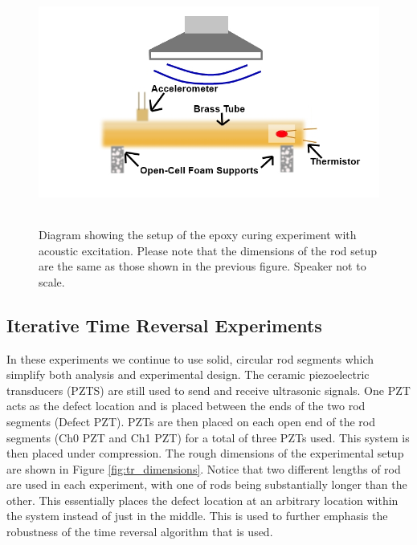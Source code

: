 \documentclass[]{aiaa-tc}%
\begin{document}
\begin{figure}[H]%
\centering
 \includegraphics[height = 8cm]{epoxy_diagram_new_speaker}
 \caption{Diagram showing the setup of the epoxy curing experiment with acoustic excitation. Please note that the dimensions of the rod setup are the same as those shown in the previous figure. Speaker not to scale.}
 \label{fig:epoxy_sound}
\end{figure}


\subsection{Iterative Time Reversal Experiments}

In these experiments we continue to use solid, circular rod segments which simplify both analysis and experimental design. The ceramic piezoelectric transducers (PZTS) are still used to send and receive ultrasonic signals. One PZT acts as the defect location and is placed between the ends of the two rod segments (Defect PZT). PZTs are then placed on each open end of the rod segments (Ch0  PZT and Ch1 PZT) for a total of three PZTs used. This system is then placed under compression. The rough dimensions of the experimental setup are shown in Figure \ref{fig:tr_dimensions}. Notice that two different lengths of rod are used in each experiment, with one of rods being substantially longer than the other. This essentially places the defect location at an arbitrary location within the system instead of just in the middle. This is used to further emphasis the robustness of the time reversal algorithm that is used.
\end{document}

